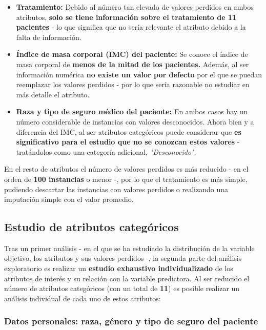 \begin{itemize}
	\item \textbf{Tratamiento:} Debido al número tan elevado de valores perdidos en ambos atributos, \textbf{solo se tiene información sobre el tratamiento de 11 pacientes} - lo que significa que no sería relevante el atributo debido a la falta de información.
	\item \textbf{Índice de masa corporal (IMC) del paciente:} Se conoce el índice de masa corporal de \textbf{menos de la mitad de los pacientes.}  Además, al ser información numérica \textbf{no existe un valor por defecto} por el que se puedan reemplazar los valores perdidos - por lo que sería razonable no estudiar en más detalle el atributo.
	\item \textbf{Raza y tipo de seguro médico del paciente:} En ambos casos hay un número considerable de instancias con valores desconocidos. Ahora bien y a diferencia del IMC, al ser atributos categóricos puede considerar que \textbf{es significativo para el estudio que no se conozcan estos valores} - tratándolos como una categoría adicional, \textit{"Desconocido"}.
\end{itemize}

En el resto de atributos el número de valores perdidos es más reducido - en el orden de \textbf{100 instancias} o menor -, por lo que el tratamiento es más simple, pudiendo descartar las instancias con valores perdidos o realizando una imputación simple con el valor promedio.

\subsection{Estudio de atributos categóricos}

Tras un primer análisis - en el que se ha estudiado la distribución de la variable objetivo, los atributos y sus valores perdidos -, la segunda parte del análisis exploratorio es realizar un \textbf{estudio exhaustivo individualizado} de los atributos de interés y su relación con la variable predictora. Al ser reducido el número de atributos categóricos (con un total de \textbf{11}) es posible realizar un análisis individual de cada uno de estos atributos:

\subsubsection{Datos personales: raza, género y tipo de seguro del paciente}


